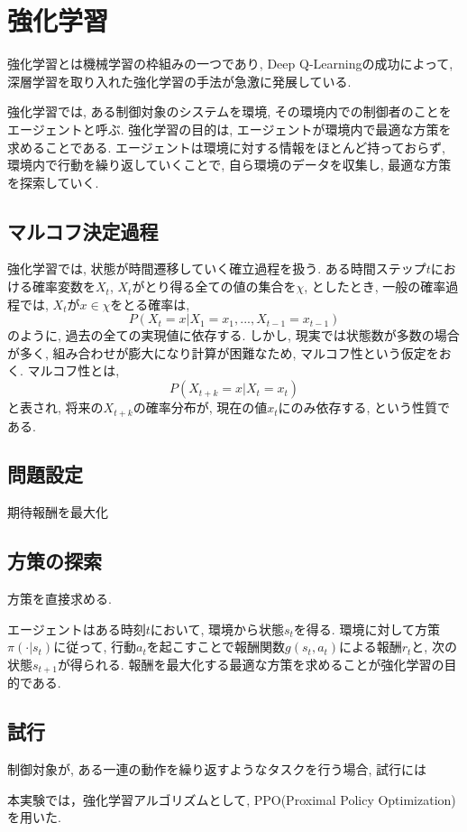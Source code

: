 \documentclass[../main]{subfiles}
\begin{document}
\newpage
\chapter{強化学習}
\label{chap:RL}
強化学習とは機械学習の枠組みの一つであり, 
Deep Q-Learning\cite{ref:dqn}の成功によって, 
深層学習を取り入れた強化学習の手法が急激に発展している.

強化学習では, ある制御対象のシステムを環境, 
その環境内での制御者のことをエージェントと呼ぶ.
強化学習の目的は, エージェントが環境内で最適な方策を求めることである.
エージェントは環境に対する情報をほとんど持っておらず, 
環境内で行動を繰り返していくことで, 
自ら環境のデータを収集し, 最適な方策を探索していく.

\section{マルコフ決定過程}
強化学習では, 状態が時間遷移していく確立過程を扱う.
ある時間ステップ$t$における確率変数を$X_t$, 
$X_t$がとり得る全ての値の集合を$\chi$, としたとき, 
一般の確率過程では, $X_t$が$x\in\chi$をとる確率は, 
$$
P(X_t=x|X_1=x_1, ... ,X_{t-1}=x_{t-1})
$$
のように, 過去の全ての実現値に依存する.
しかし, 現実では状態数が多数の場合が多く, 
組み合わせが膨大になり計算が困難なため, 
マルコフ性という仮定をおく.
マルコフ性とは, 
$$P(X_{t+k}=x|X_t=x_t)$$
と表され, 将来の$X_{t+k}$の確率分布が, 
現在の値$x_t$にのみ依存する, という性質である.


\section{問題設定}
期待報酬を最大化

\section{方策の探索}
方策を直接求める.

エージェントはある時刻$t$において, 環境から状態$s_t$を得る.
環境に対して方策$\pi(\cdot|s_t)$に従って, 
行動$a_t$を起こすことで報酬関数$g(s_t,a_t)$による報酬$r_t$と, 
次の状態$s_{t+1}$が得られる. 
報酬を最大化する最適な方策を求めることが強化学習の目的である.

\section{試行}
制御対象が, ある一連の動作を繰り返すようなタスクを行う場合, 
試行には


本実験では，強化学習アルゴリズムとして, 
PPO(Proximal Policy Optimization)
\cite{ref:proximal_policy}を用いた.
\end{document}
